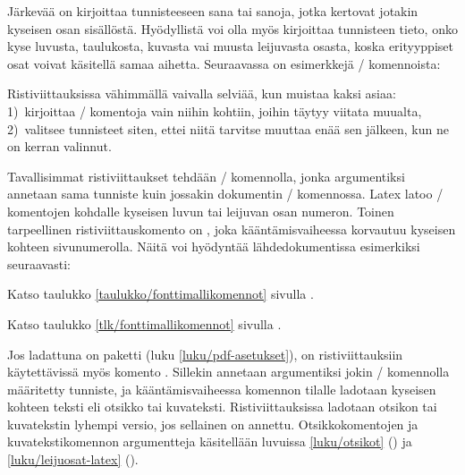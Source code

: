 Järkevää on kirjoittaa tunnisteeseen sana tai sanoja, jotka kertovat
jotakin kyseisen osan sisällöstä. Hyödyllistä voi olla myös kirjoittaa
tunnisteen tieto, onko kyse luvusta, taulukosta, kuvasta vai muusta
leijuvasta osasta, koska erityyppiset osat voivat käsitellä samaa
aihetta. Seuraavassa on esimerkkejä \-/ komennoista:

\begin{koodilohkosis}
\label{luku/fonttien-valinta}    %
\label{taulukko/fonttikomentoja} %
\label{kuva/kirjainleikkauksia}  %
\end{koodilohkosis}

Ristiviittauksissa vähimmällä vaivalla selviää, kun muistaa kaksi asiaa:
1)~kirjoittaa \-/ komentoja vain niihin kohtiin, joihin
täytyy viitata muualta, 2)~valitsee tunnisteet siten, ettei niitä
tarvitse muuttaa enää sen jälkeen, kun ne on kerran valinnut.

Tavallisimmat ristiviittaukset tehdään \-/ komennolla,
jonka argumentiksi annetaan sama tunniste kuin jossakin dokumentin
\-/ komennossa. Latex latoo \-/ komentojen
kohdalle kyseisen luvun tai leijuvan osan numeron. Toinen tarpeellinen
ristiviittauskomento on , joka kääntämisvaiheessa
korvautuu kyseisen kohteen sivunumerolla. Näitä voi hyödyntää
lähdedokumentissa esimerkiksi seuraavasti:

\begin{koodilohkosis}
Katso taulukko \ref{taulukko/fonttimallikomennot} sivulla
\pageref{taulukko/fonttimallikomennot}.
\end{koodilohkosis}

\begin{tulossis}
  Katso taulukko \ref{tlk/fonttimallikomennot} sivulla
  \pageref{tlk/fonttimallikomennot}.
\end{tulossis}

Jos ladattuna on paketti  (luku
\ref{luku/pdf-asetukset}), on ristiviittauksiin käytettävissä myös
komento . Sillekin annetaan argumentiksi jokin
\-/ komennolla määritetty tunniste, ja kääntämisvaiheessa
komennon tilalle ladotaan kyseisen kohteen teksti eli otsikko tai
kuvateksti. Ristiviittauksissa ladotaan otsikon tai kuvatekstin lyhempi
versio, jos sellainen on annettu. Otsikkokomentojen ja
kuvatekstikomennon argumentteja käsitellään luvuissa \ref{luku/otsikot}
() ja \ref{luku/leijuosat-latex}
().

